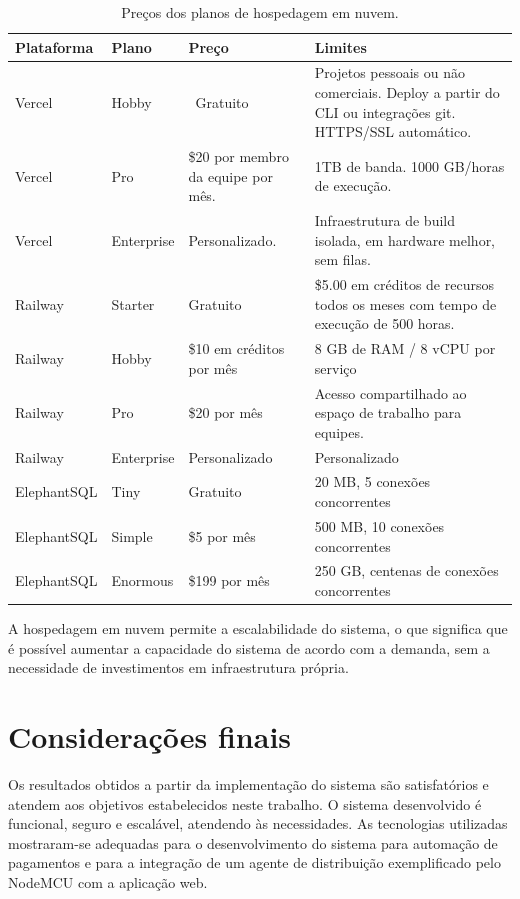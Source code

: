 \begin{table}[htb]
	\ABNTEXfontereduzida
	\caption{\label{tab:Tab_1}Preços dos planos de hospedagem em nuvem.}
 \begin{center}
	\begin{tabular}{@{}p{2.0cm}p{1.5cm}p{3.0cm}p{3.5cm}@{}}
		\toprule
		\textbf{Plataforma} & \textbf{Plano} & \textbf{Preço} & \textbf{Limites} \\ \midrule
		Vercel & Hobby & \ Gratuito & Projetos pessoais ou não comerciais. Deploy a partir do CLI ou integrações git. HTTPS/SSL automático. \\
		Vercel & Pro & \$20 por membro da equipe por mês. & 1TB de banda. 1000 GB/horas de execução. \\
		Vercel & Enterprise & Personalizado. & Infraestrutura de build isolada, em hardware melhor, sem filas. \\
		Railway & Starter & Gratuito & \$5.00 em créditos de recursos todos os meses com tempo de execução de 500 horas. \\
		Railway & Hobby & \$10 em créditos por mês & 8 GB de RAM / 8 vCPU por serviço \\
		Railway & Pro & \$20 por mês & Acesso compartilhado ao espaço de trabalho para equipes. \\
		Railway & Enterprise & Personalizado & Personalizado \\
		ElephantSQL & Tiny & Gratuito & 20 MB, 5 conexões concorrentes \\
		ElephantSQL & Simple & \$5 por mês & 500 MB, 10 conexões concorrentes \\
            ElephantSQL & Enormous & \$199 por mês & 250 GB, centenas de conexões concorrentes \\
  \bottomrule
	\end{tabular}
 \end{center}
\end{table}

A hospedagem em nuvem permite a escalabilidade do sistema, o que significa que é possível aumentar a capacidade do sistema de acordo com a demanda, sem a necessidade de investimentos em infraestrutura própria.

\section{Considerações finais} \label{cap:final}

Os resultados obtidos a partir da implementação do sistema são satisfatórios e atendem aos objetivos estabelecidos neste trabalho. O sistema desenvolvido é funcional, seguro e escalável, atendendo às necessidades. As tecnologias utilizadas mostraram-se adequadas para o desenvolvimento do sistema para automação de pagamentos e para a integração de um agente de distribuição exemplificado pelo NodeMCU com a aplicação web.

